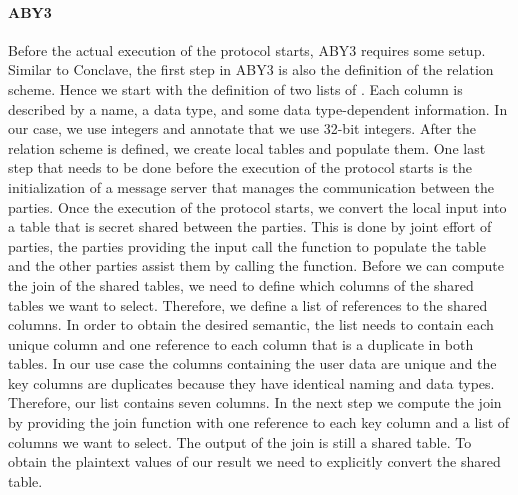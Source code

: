 \paragraph{ABY3}
Before the actual execution of the protocol starts, ABY3 requires some setup. Similar to Conclave, the first step in ABY3 is also the definition of the relation scheme. Hence we start with the definition of two lists of . Each column is described by a name, a data type, and some data type-dependent information. In our case, we use integers and annotate that we use 32-bit integers. After the relation scheme is defined, we create local tables and populate them. One last step that needs to be done before the execution of the protocol starts is the initialization of a message server that manages the communication between the parties.
Once the execution of the protocol starts, we convert the local input into a table that is secret shared between the parties. 
This is done by joint effort of parties, the parties providing the input call the  function to populate the table and the other parties assist them by calling the  function. 
Before we can compute the join of the shared tables, we need to define which columns of the shared tables we want to select. Therefore, we define a list of references to the shared columns. In order to obtain the desired semantic, the list needs to contain each unique column and one reference to each column that is a duplicate in both tables. 
In our use case the columns containing the user data are unique and the key columns are duplicates because they have identical naming and data types. Therefore, our list contains seven columns. In the next step we compute the join by providing the join function with one reference to each key column and a list of columns we want to select. The output of the join is still a shared table. To obtain the plaintext values of our result we need to explicitly convert the shared table.  


